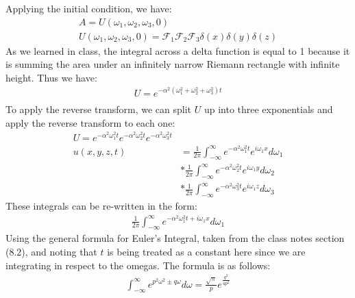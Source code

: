 \documentclass{article}
\begin{document}
Applying the initial condition, we have:
\begin{equation}
\begin{aligned}
A = U(\omega_1, \omega_2, \omega_3, 0)\\
U(\omega_1, \omega_2, \omega_3, 0) = \mathcal{F}_1\mathcal{F}_2\mathcal{F}_3\delta (x)\delta (y) \delta(z)
\end{aligned}
\end{equation}
As we learned in class, the integral across a delta function is equal to 1 because it is summing the area under an infinitely narrow Riemann rectangle with infinite height. Thus we have:
\begin{equation}
\begin{aligned}
U = e^{-\alpha^2(\omega_1^2 + \omega_2^2 + \omega_3^2)t}\\
\end{aligned}
\end{equation}
To apply the reverse transform, we can split $U$ up into three exponentials and apply the reverse transform to each one:
\begin{equation}
\begin{aligned}
U = e^{-\alpha^2\omega_1^2t}e^{-\alpha^2\omega_2^2t} e^{-\alpha^2\omega_3^2t}\\
u(x,y,z,t) &= \frac{1}{2\pi}\int_{-\infty}^{\infty}e^{-\alpha^2\omega_1^2t}e^{i\omega_1 x}d\omega_1\\
&*\frac{1}{2\pi}\int_{-\infty}^{\infty}e^{-\alpha^2\omega_2^2t}e^{i\omega_1 y}d\omega_2\\
&*\frac{1}{2\pi}\int_{-\infty}^{\infty}e^{-\alpha^2\omega_3^2t}e^{i\omega_1 z}d\omega_3
\end{aligned}
\end{equation}
These integrals can be re-written in the form:
\begin{equation}
\begin{aligned}
\frac{1}{2\pi}\int_{-\infty}^{\infty}e^{-\alpha^2\omega_1^2t + i\omega_1 x}d\omega_1
\end{aligned}
\end{equation}
Using the general formula for Euler's Integral, taken from the class notes section (8.2), and noting that $t$ is being treated as a constant here since we are integrating in respect to the omegas. The formula is as follows:
\begin{equation}
\begin{aligned}
\int_{-\infty}^{\infty}e^{p^2\omega^2 \pm q\omega}d\omega = \frac{\sqrt{\pi}}{p}e^{\frac{q^2}{4p^2}}
\end{aligned}
\end{equation}
\end{document}
